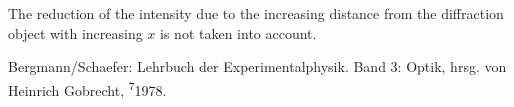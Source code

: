 \documentclass{scrartcl}
\begin{document}
The reduction of the intensity due to the increasing distance from the diffraction object with increasing $x$ is not taken into account.

\begin{thebibliography}{9}
 Bergmann/Schaefer: Lehrbuch der Experimentalphysik. Band 3: Optik, hrsg. von Heinrich Gobrecht, \textsuperscript{7}1978.
\end{thebibliography}
\end{document}
